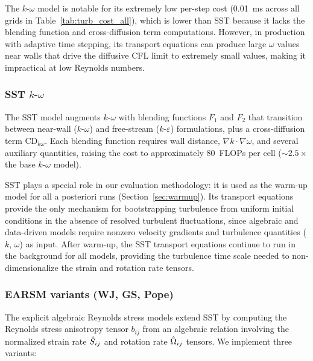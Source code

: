 The $k$-$\omega$ model is notable for its extremely low per-step cost (0.01~ms across all grids in Table~\ref{tab:turb_cost_all}), which is lower than SST because it lacks the blending function and cross-diffusion term computations.
However, in production with adaptive time stepping, its transport equations can produce large $\omega$ values near walls that drive the diffusive CFL limit to extremely small values, making it impractical at low Reynolds numbers.

\subsubsection{SST $k$-$\omega$}
\label{sec:sst}

The SST model \citep{Menter1994} augments $k$-$\omega$ with blending functions $F_1$ and $F_2$ that transition between near-wall ($k$-$\omega$) and free-stream ($k$-$\varepsilon$) formulations, plus a cross-diffusion term $\mathrm{CD}_{k\omega}$.
Each blending function requires wall distance, $\nabla k \cdot \nabla \omega$, and several auxiliary quantities, raising the cost to approximately 80~FLOPs per cell ($\sim$$2.5\times$ the base $k$-$\omega$ model).

SST plays a special role in our evaluation methodology: it is used as the warm-up model for all a posteriori runs (Section~\ref{sec:warmup}).
Its transport equations provide the only mechanism for bootstrapping turbulence from uniform initial conditions in the absence of resolved turbulent fluctuations, since algebraic and data-driven models require nonzero velocity gradients and turbulence quantities ($k$, $\omega$) as input.
After warm-up, the SST transport equations continue to run in the background for all models, providing the turbulence time scale needed to non-dimensionalize the strain and rotation rate tensors.

\subsubsection{EARSM variants (WJ, GS, Pope)}
\label{sec:earsm}

The explicit algebraic Reynolds stress models extend SST by computing the Reynolds stress anisotropy tensor $b_{ij}$ from an algebraic relation involving the normalized strain rate $\hat{S}_{ij}$ and rotation rate $\hat{\Omega}_{ij}$ tensors.
We implement three variants:


